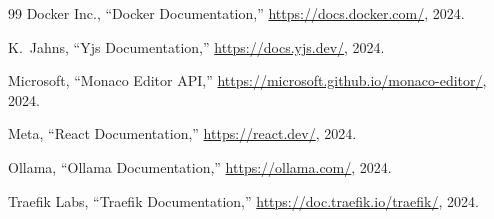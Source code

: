 \documentclass[12pt,a4paper,oneside]{report}
\begin{document}
\begin{thebibliography}{99}
Docker Inc., ``Docker Documentation,'' \url{https://docs.docker.com/}, 2024.

K.~Jahns, ``Yjs Documentation,'' \url{https://docs.yjs.dev/}, 2024.

Microsoft, ``Monaco Editor API,'' \url{https://microsoft.github.io/monaco-editor/}, 2024.

Meta, ``React Documentation,'' \url{https://react.dev/}, 2024.

Ollama, ``Ollama Documentation,'' \url{https://ollama.com/}, 2024.

Traefik Labs, ``Traefik Documentation,'' \url{https://doc.traefik.io/traefik/}, 2024.

\end{thebibliography}

\end{document}
